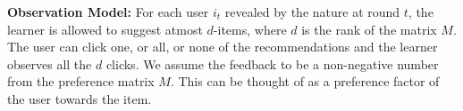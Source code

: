 %
%
%



\textbf{Observation Model:} For each user $i_t$ revealed by the nature at round $t$, the learner is allowed to suggest atmost $d$-items, where $d$ is the rank of the matrix $M$. The user can click one, or all, or none of the recommendations and the learner observes all the $d$ clicks. We assume the feedback to be a non-negative number from the preference matrix $M$. This can be thought of as a preference factor of the user towards the item.

